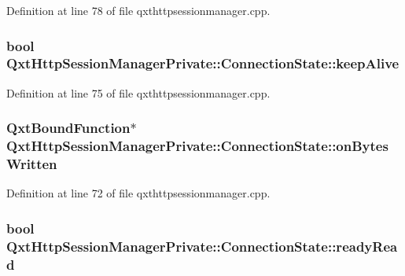 Definition at line 78 of file qxthttpsessionmanager.\-cpp.

\hypertarget{struct_qxt_http_session_manager_private_1_1_connection_state_a2203300ba2fcd904fa95ab659950cf94}{
\subsubsection[{keep\-Alive}]{\setlength{\rightskip}{0pt plus 5cm}bool Qxt\-Http\-Session\-Manager\-Private\-::\-Connection\-State\-::keep\-Alive}}\label{struct_qxt_http_session_manager_private_1_1_connection_state_a2203300ba2fcd904fa95ab659950cf94}


Definition at line 75 of file qxthttpsessionmanager.\-cpp.

\hypertarget{struct_qxt_http_session_manager_private_1_1_connection_state_aedb3b55fbb0fce751f5c74419d553964}{
\subsubsection[{on\-Bytes\-Written}]{\setlength{\rightskip}{0pt plus 5cm}Qxt\-Bound\-Function$\ast$ Qxt\-Http\-Session\-Manager\-Private\-::\-Connection\-State\-::on\-Bytes\-Written}}\label{struct_qxt_http_session_manager_private_1_1_connection_state_aedb3b55fbb0fce751f5c74419d553964}


Definition at line 72 of file qxthttpsessionmanager.\-cpp.

\hypertarget{struct_qxt_http_session_manager_private_1_1_connection_state_a8b770b73ac3b307698d6e180a5826dd8}{
\subsubsection[{ready\-Read}]{\setlength{\rightskip}{0pt plus 5cm}bool Qxt\-Http\-Session\-Manager\-Private\-::\-Connection\-State\-::ready\-Read}}\label{struct_qxt_http_session_manager_private_1_1_connection_state_a8b770b73ac3b307698d6e180a5826dd8}


